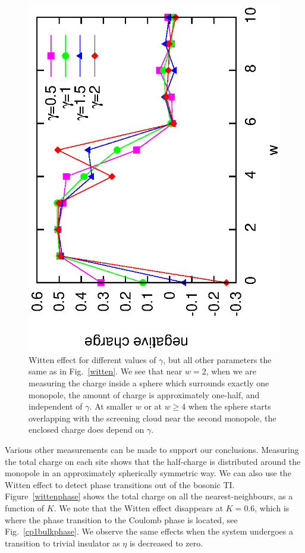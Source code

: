 \documentclass[prb,twocolumn]{revtex4-1}
\newcommand{\scripty}[1]{w}
\begin{document}
\begin{figure}
\includegraphics[angle=-90,width=\linewidth]{figures/wittendiff.eps}
\caption{Witten effect for different values of $\gamma$, but all other parameters the same as in Fig.~\ref{witten}. We see that near $\scripty{r}=2$, when we are measuring the charge inside a sphere which surrounds exactly one monopole, the amount of charge is approximately one-half, and independent of $\gamma$. At smaller $\scripty{r}$ or at $\scripty{r} \geq 4$ when the sphere starts overlapping with the screening cloud near the second monopole, the enclosed charge does depend on $\gamma$.}
\label{diffgamma}
\end{figure}

Various other measurements can be made to support our conclusions. Measuring the total charge on each site shows that the half-charge is distributed around the monopole in an approximately spherically symmetric way. We can also use the Witten effect to detect phase transitions out of the bosonic TI. Figure~\ref{wittenphase} shows the total charge on all the nearest-neighbours, as a function of $K$. We note that the Witten effect disappears at $K=0.6$, which is where the phase transition to the Coulomb phase is located, see Fig.~\ref{cp1bulkphase}. We observe the same effects when the system undergoes a transition to trivial insulator as $\eta$ is decreased to zero.
\end{document}
